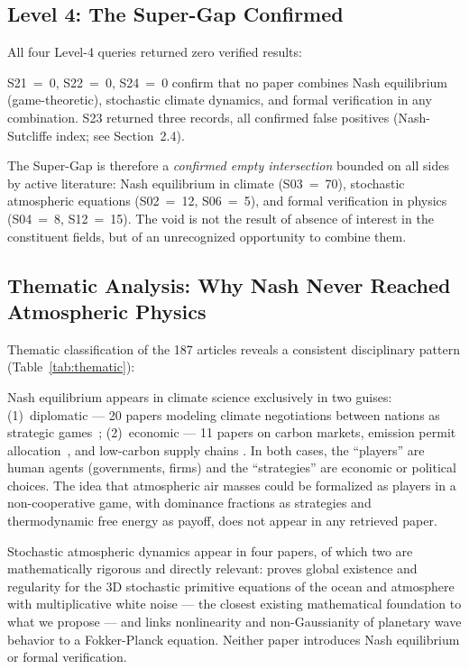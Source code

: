 \documentclass[12pt,a4paper]{article}
\begin{document}
\subsection{Level 4: The Super-Gap Confirmed}

All four Level-4 queries returned zero verified results:

S21~=~0, S22~=~0, S24~=~0 confirm that no paper combines Nash
equilibrium (game-theoretic), stochastic climate dynamics, and formal
verification in any combination. S23 returned three records, all
confirmed false positives (Nash-Sutcliffe index; see Section~2.4).

The Super-Gap is therefore a \textit{confirmed empty intersection}
bounded on all sides by active literature: Nash equilibrium in climate
(S03~=~70), stochastic atmospheric equations (S02~=~12, S06~=~5),
and formal verification in physics (S04~=~8, S12~=~15). The void is
not the result of absence of interest in the constituent fields, but of
an unrecognized opportunity to combine them.

\subsection{Thematic Analysis: Why Nash Never Reached Atmospheric Physics}

Thematic classification of the 187 articles reveals a consistent
disciplinary pattern (Table~\ref{tab:thematic}):

Nash equilibrium appears in climate science exclusively in two guises:
(1)~diplomatic — 20 papers modeling climate negotiations between nations
as strategic games~\citep{DeCanio2013, Forgo2005, Breton2003, Long2018}; (2)~economic — 11
papers on carbon markets, emission permit allocation~\citep{Haurie2004}, and low-carbon
supply chains \citep{Hamidoglu2024}. In both cases, the ``players'' are
human agents (governments, firms) and the ``strategies'' are economic or
political choices. The idea that atmospheric air masses could be
formalized as players in a non-cooperative game, with dominance
fractions as strategies and thermodynamic free energy as payoff, does
not appear in any retrieved paper.

Stochastic atmospheric dynamics appear in four papers, of which two are
mathematically rigorous and directly relevant: \citet{Debussche2012}
proves global existence and regularity for the 3D stochastic primitive
equations of the ocean and atmosphere with multiplicative white noise —
the closest existing mathematical foundation to what we propose — and
\citet{Majda2006} links nonlinearity and non-Gaussianity of planetary
wave behavior to a Fokker-Planck equation. Neither paper introduces Nash
equilibrium or formal verification.
\end{document}
